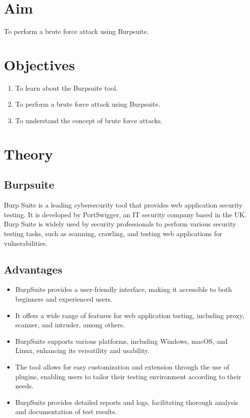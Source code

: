 \documentclass[11pt]{article}
\begin{document}
\tableofcontents
\thispagestyle{empty}
\clearpage

\setcounter{page}{1}

\section{Aim}
To perform a brute force attack using Burpsuite.

\section{Objectives}
\begin{enumerate}
    \item To learn about the Burpsuite tool.
    \item To perform a brute force attack using Burpsuite.
    \item To understand the concept of brute force attacks.
\end{enumerate}

\section{Theory}

\subsection{Burpsuite}
Burp Suite is a leading cybersecurity tool that provides web application security testing. It is developed by PortSwigger, an IT security company based in the UK. Burp Suite is widely used by security professionals to perform various security testing tasks, such as scanning, crawling, and testing web applications for vulnerabilities.

\subsection{Advantages}
\begin{itemize}
    \item BurpSuite provides a user-friendly interface, making it accessible to both beginners and experienced users.
    \item It offers a wide range of features for web application testing, including proxy, scanner, and intruder, among others.
    \item BurpSuite supports various platforms, including Windows, macOS, and Linux, enhancing its versatility and usability.
    \item The tool allows for easy customization and extension through the use of plugins, enabling users to tailor their testing environment according to their needs.
    \item BurpSuite provides detailed reports and logs, facilitating thorough analysis and documentation of test results.
\end{itemize}
\end{document}
